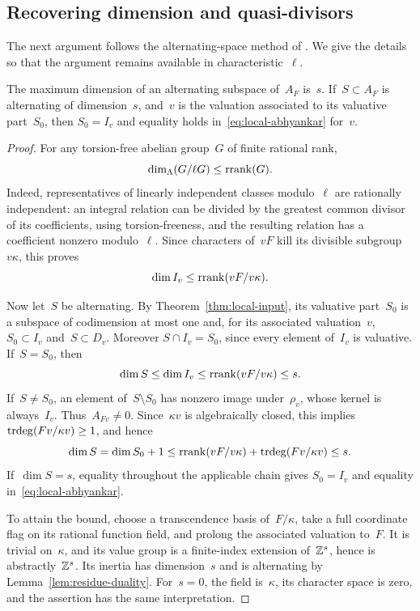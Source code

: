 \subsection{Recovering dimension and quasi-divisors}

The next argument follows the alternating-space method of
\cite[Fact~3.2 and Theorem~3.3]{Topaz2020}.  We give the details so that
the argument remains available in characteristic~\(\ell\).

\begin{proposition}
\label{prop:local-dimension}
The maximum dimension of an alternating subspace of~\(A_F\) is~\(s\).
If~\(S\subset A_F\) is alternating of dimension~\(s\), and~\(v\) is
the valuation associated to its valuative part~\(S_0\), then
\(S_0=I_v\) and equality holds in~\eqref{eq:local-abhyankar} for~\(v\).
\end{proposition}

\begin{proof}
For any torsion-free abelian group~\(G\) of finite rational rank,
\[
 \dim_\Lambda(G/\ell G)\leq\operatorname{rrank}(G).
\]
Indeed, representatives of linearly independent classes modulo~\(\ell\)
are rationally independent: an integral relation can be divided by
the greatest common divisor of its coefficients, using torsion-freeness,
and the resulting relation has a coefficient nonzero modulo~\(\ell\).
Since characters of~\(vF\) kill its divisible subgroup~\(v\kappa\),
this proves
\[
 \dim I_v\leq\operatorname{rrank}(vF/v\kappa).
\]

Now let~\(S\) be alternating.  By Theorem~\ref{thm:local-input}, its
valuative part~\(S_0\) is a subspace of codimension at most one and,
for its associated valuation~\(v\),
\(S_0\subset I_v\) and~\(S\subset D_v\).  Moreover
\(S\cap I_v=S_0\), since every element of~\(I_v\) is valuative.
If~\(S=S_0\), then
\[
 \dim S\leq\dim I_v\leq\operatorname{rrank}(vF/v\kappa)\leq s.
\]
If~\(S\ne S_0\), an element of~\(S\setminus S_0\) has nonzero
image under~\(\rho_v\), whose kernel is always~\(I_v\).
Thus~\(A_{Fv}\ne0\).  Since~\(\kappa v\) is algebraically closed,
this implies~\(\operatorname{trdeg}(Fv/\kappa v)\geq1\), and hence
\[
 \dim S=\dim S_0+1
 \leq\operatorname{rrank}(vF/v\kappa)+\operatorname{trdeg}(Fv/\kappa v)\leq s.
\]
If~\(\dim S=s\), equality throughout the applicable chain gives
\(S_0=I_v\) and equality in~\eqref{eq:local-abhyankar}.

To attain the bound, choose a transcendence basis of~\(F/\kappa\),
take a full coordinate flag on its rational function field, and prolong
the associated valuation to~\(F\).  It is trivial on~\(\kappa\), and
its value group is a finite-index extension of~\(\mathbb Z^s\), hence is
abstractly~\(\mathbb Z^s\).  Its inertia has dimension~\(s\) and is
alternating by Lemma~\ref{lem:residue-duality}.  For~\(s=0\), the
field is~\(\kappa\), its character space is zero, and the assertion
has the same interpretation.
\end{proof}


